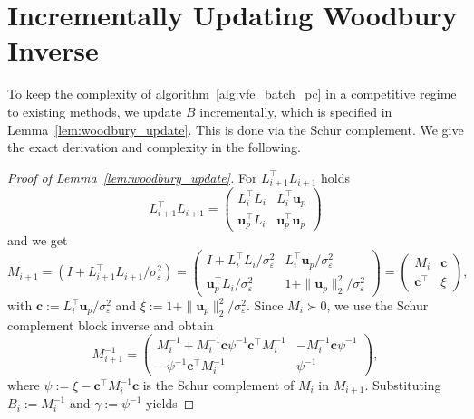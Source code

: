 \documentclass[onefignum,onetabnum]{siamart250211}
\begin{document}
\section{Incrementally Updating Woodbury Inverse} \label{app:woodburyInverse}
To keep the complexity of algorithm~\ref{alg:vfe_batch_pc} in a competitive regime to existing methods, we update $B$ incrementally, which is specified in Lemma~\ref{lem:woodbury_update}. This is done via the Schur complement. We give the exact derivation and complexity in the following.
\begin{proof}[Proof of Lemma~\ref{lem:woodbury_update}]
    For $L_{i+1}^\top L_{i+1}$ holds
    \begin{equation*}
        L_{i+1}^\top L_{i+1} = 
        \begin{pmatrix}
            L_i^\top L_i & L_i^\top \bm{u}_p \\
            \bm{u}_p^\top L_i & \bm{u}_p^\top \bm{u}_p
        \end{pmatrix}
    \end{equation*}
    and we get 
    \begin{equation*}
        M_{i+1} = \left(I +  L_{i+1}^\top L_{i+1}/\sigma_\varepsilon^{2} \right) =
        \begin{pmatrix}
            I + L_i^\top L_i/\sigma_\varepsilon^{2} & L_i^\top \bm{u}_p/\sigma_\varepsilon^{2} \\
            \bm{u}_p^\top L_i/\sigma_\varepsilon^{2}  & 1 + \|\bm{u}_p\|_2^2/\sigma_\varepsilon^2
        \end{pmatrix}
        =
        \begin{pmatrix}
            M_i & \bm{c} \\
            \bm{c}^\top & \xi
        \end{pmatrix},
    \end{equation*}
    with $\bm{c} := L_i^\top\bm{u}_p/\sigma_\varepsilon^2$ and $\xi := 1 + \|\bm{u}_p\|_2^2/\sigma_\varepsilon^2$.
    Since $M_i \succ 0$, we use the Schur complement block inverse and obtain
    \begin{equation*}
        M_{i+1}^{-1} = 
        \begin{pmatrix}
            M_i^{-1} + M_i^{-1}\bm{c}\psi^{-1}\bm{c}^\top M_i^{-1} & - M_i^{-1}\bm{c}\psi^{-1} \\
            -\psi^{-1}\bm{c}^\top M_i^{-1} & \psi^{-1} 
        \end{pmatrix},
    \end{equation*}
    where $\psi := \xi - \bm{c}^\top M_i^{-1} \bm{c}$ is the Schur complement of $M_i$ in $M_{i+1}$. Substituting $B_i := M_i^{-1}$ and $\gamma := \psi^{-1}$ yields

\end{proof}
\end{document}

